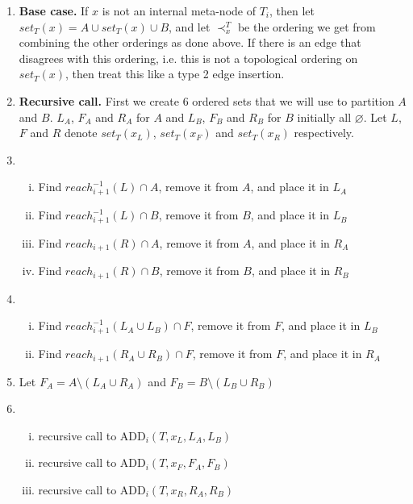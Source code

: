 \documentclass{article}
\begin{document}
\begin{enumerate}
    \item \textbf{Base case.} If $x$ is not an internal meta-node of $T_{i}$, then let $set_{T}(x)=A\cup set_{T}(x)\cup B$, and let $\prec_{x}^{T}$ be the ordering we get from combining the other orderings as done above. If there is an edge that disagrees with this ordering, i.e. this is not a topological ordering on $set_{T}(x)$, then treat this like a type 2 edge insertion. 
    \item \textbf{Recursive call.} First we create 6 ordered sets that we will use to partition $A$ and $B$. $L_{A}$, $F_{A}$ and $R_{A}$ for $A$ and $L_{B}$, $F_{B}$ and $R_{B}$ for $B$ initially all $\varnothing$. Let $L$, $F$ and $R$ denote $set_{T}(x_{L})$, $set_{T}(x_{F})$ and $set_{T}(x_{R})$ respectively.
    \item \begin{enumerate}[i.] 
        \item Find $reach_{i+1}^{-1}(L) \cap A$, remove it from $A$, and place it in $L_{A}$
        \item Find $reach_{i+1}^{-1}(L) \cap B$, remove it from $B$, and place it in $L_{B}$
        \item Find $reach_{i+1}(R) \cap A$, remove it from $A$, and place it in $R_{A}$
        \item Find $reach_{i+1}(R) \cap B$, remove it from $B$, and place it in $R_{B}$
        \end{enumerate}
    \item \begin{enumerate}[i.] 
        \item Find $reach_{i+1}^{-1}(L_{A} \cup L_{B}) \cap F$, remove it from $F$, and place it in $L_{B}$
        \item Find $reach_{i+1}(R_{A} \cup R_{B}) \cap F$, remove it from $F$, and place it in $R_{A}$
        \end{enumerate}
    \item Let $F_{A}=A \setminus (L_{A} \cup R_{A})$ and $F_{B}=B \setminus (L_{B} \cup R_{B})$
    \item \begin{enumerate}[i.] 
        \item recursive call to ADD$_{i}(T,x_{L},L_{A},L_{B})$
        \item recursive call to ADD$_{i}(T,x_{F},F_{A},F_{B})$
        \item recursive call to ADD$_{i}(T,x_{R},R_{A},R_{B})$
        \end{enumerate}
\end{enumerate}
\end{document}
